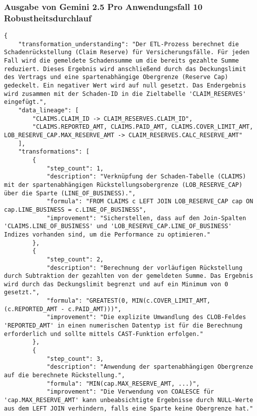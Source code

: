 \subsubsection{Ausgabe von Gemini 2.5 Pro Anwendungsfall 10 Robustheitsdurchlauf}\label{anhang:subsubsec:gemini_case10_prompt3}
\begin{lstlisting}[caption={Ausgabe: Gemini 2.5 Pro Anwendungsfall 10 Robustheitsdurchlauf},label={gemini_case10_prompt3}]
{
    "transformation_understanding": "Der ETL-Prozess berechnet die Schadenrückstellung (Claim Reserve) für Versicherungsfälle. Für jeden Fall wird die gemeldete Schadensumme um die bereits gezahlte Summe reduziert. Dieses Ergebnis wird anschließend durch das Deckungslimit des Vertrags und eine spartenabhängige Obergrenze (Reserve Cap) gedeckelt. Ein negativer Wert wird auf null gesetzt. Das Endergebnis wird zusammen mit der Schaden-ID in die Zieltabelle 'CLAIM_RESERVES' eingefügt.",
    "data_lineage": [
        "CLAIMS.CLAIM_ID -> CLAIM_RESERVES.CLAIM_ID",
        "CLAIMS.REPORTED_AMT, CLAIMS.PAID_AMT, CLAIMS.COVER_LIMIT_AMT, LOB_RESERVE_CAP.MAX_RESERVE_AMT -> CLAIM_RESERVES.CALC_RESERVE_AMT"
    ],
    "transformations": [
        {
            "step_count": 1,
            "description": "Verknüpfung der Schaden-Tabelle (CLAIMS) mit der spartenabhängigen Rückstellungsobergrenze (LOB_RESERVE_CAP) über die Sparte (LINE_OF_BUSINESS).",
            "formula": "FROM CLAIMS c LEFT JOIN LOB_RESERVE_CAP cap ON cap.LINE_BUSINESS = c.LINE_OF_BUSINESS",
            "improvement": "Sicherstellen, dass auf den Join-Spalten 'CLAIMS.LINE_OF_BUSINESS' und 'LOB_RESERVE_CAP.LINE_OF_BUSINESS' Indizes vorhanden sind, um die Performance zu optimieren."
        },
        {
            "step_count": 2,
            "description": "Berechnung der vorläufigen Rückstellung durch Subtraktion der gezahlten von der gemeldeten Summe. Das Ergebnis wird durch das Deckungslimit begrenzt und auf ein Minimum von 0 gesetzt.",
            "formula": "GREATEST(0, MIN(c.COVER_LIMIT_AMT, (c.REPORTED_AMT - c.PAID_AMT)))",
            "improvement": "Die explizite Umwandlung des CLOB-Feldes 'REPORTED_AMT' in einen numerischen Datentyp ist für die Berechnung erforderlich und sollte mittels CAST-Funktion erfolgen."
        },
        {
            "step_count": 3,
            "description": "Anwendung der spartenabhängigen Obergrenze auf die berechnete Rückstellung.",
            "formula": "MIN(cap.MAX_RESERVE_AMT, ...)",
            "improvement": "Die Verwendung von COALESCE für 'cap.MAX_RESERVE_AMT' kann unbeabsichtigte Ergebnisse durch NULL-Werte aus dem LEFT JOIN verhindern, falls eine Sparte keine Obergrenze hat."

\end{lstlisting}
